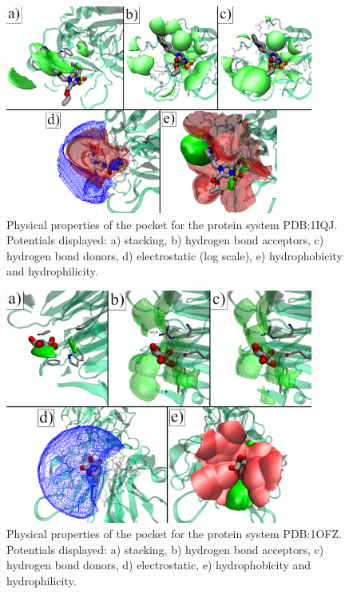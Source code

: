 \begin{figure}[H]
  \centering
  \includegraphics[width=0.9\textwidth]{figures/appendix/benchmark_prot/1iqj.png}
  \caption{\label{fig:appx_benchmark/1iqj} Physical properties of the pocket for the protein system PDB:1IQJ. Potentials displayed: a) stacking, b) hydrogen bond acceptors, c) hydrogen bond donors, d) electrostatic (log scale), e) hydrophobicity and hydrophilicity.}
\end{figure}

\begin{figure}[H]
  \centering
  \includegraphics[width=0.9\textwidth]{figures/appendix/benchmark_prot/1ofz.png}
  \caption{\label{fig:appx_benchmark/1ofz} Physical properties of the pocket for the protein system PDB:1OFZ. Potentials displayed: a) stacking, b) hydrogen bond acceptors, c) hydrogen bond donors, d) electrostatic, e) hydrophobicity and hydrophilicity.}
\end{figure}

